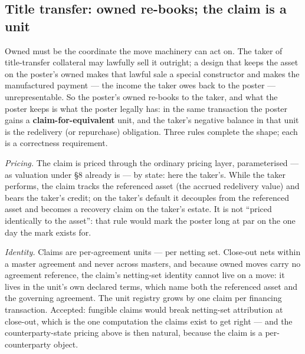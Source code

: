 \documentclass[11pt,a4paper]{article}
\begin{document}
\subsection{Title transfer: owned re-books; the claim is a unit}

Owned must be the coordinate the move machinery can act on. The taker of
title-transfer collateral may lawfully sell it outright; a design that keeps
the asset on the poster's owned makes that lawful sale a special constructor
and makes the manufactured payment --- the income the taker owes back to the
poster --- unrepresentable. So the poster's owned re-books to the taker, and
what the poster keeps is what the poster legally has: in the same transaction
the poster gains a \textbf{claim-for-equivalent} unit, and the taker's
negative balance in that unit is the redelivery (or repurchase) obligation.
Three rules complete the shape; each is a correctness requirement.

\emph{Pricing.} The claim is priced through the ordinary pricing layer,
parameterised --- as valuation under \S8 already is --- by state: here the
taker's. While the taker performs, the claim tracks the referenced asset (the
accrued redelivery value) and bears the taker's credit; on the taker's default
it decouples from the referenced asset and becomes a recovery claim on the
taker's estate. It is not ``priced identically to the asset'': that rule would
mark the poster long at par on the one day the mark exists for.

\emph{Identity.} Claims are per-agreement units --- per netting set. Close-out
nets within a master agreement and never across masters, and because owned
moves carry no agreement reference, the claim's netting-set identity cannot
live on a move: it lives in the unit's own declared terms, which name both the
referenced asset and the governing agreement. The unit registry grows by one
claim per financing transaction. Accepted: fungible claims would break
netting-set attribution at close-out, which is the one computation the claims
exist to get right --- and the counterparty-state pricing above is then
natural, because the claim is a per-counterparty object.
\end{document}
